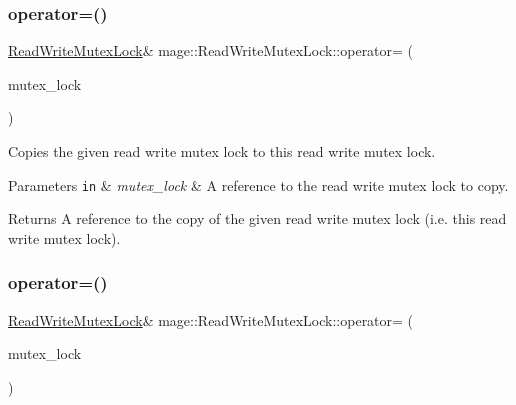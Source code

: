 \subsubsection{\texorpdfstring{operator=()}{operator=()}\hspace{0.1cm}{\footnotesize\ttfamily [1/2]}}
{\footnotesize\ttfamily \hyperlink{structmage_1_1_read_write_mutex_lock}{Read\+Write\+Mutex\+Lock}\& mage\+::\+Read\+Write\+Mutex\+Lock\+::operator= (\begin{DoxyParamCaption}\item[{const \hyperlink{structmage_1_1_read_write_mutex_lock}{Read\+Write\+Mutex\+Lock} \&}]{mutex\+\_\+lock }\end{DoxyParamCaption})\hspace{0.3cm}{\ttfamily [delete]}}

Copies the given read write mutex lock to this read write mutex lock.


\begin{DoxyParams}[1]{Parameters}
\mbox{\tt in}  & {\em mutex\+\_\+lock} & A reference to the read write mutex lock to copy. \\
\hline
\end{DoxyParams}
\begin{DoxyReturn}{Returns}
A reference to the copy of the given read write mutex lock (i.\+e. this read write mutex lock). 
\end{DoxyReturn}
\hypertarget{structmage_1_1_read_write_mutex_lock_a0c31334330a9259b0b68d71b9ee13704}{}\label{structmage_1_1_read_write_mutex_lock_a0c31334330a9259b0b68d71b9ee13704} 
\subsubsection{\texorpdfstring{operator=()}{operator=()}\hspace{0.1cm}{\footnotesize\ttfamily [2/2]}}
{\footnotesize\ttfamily \hyperlink{structmage_1_1_read_write_mutex_lock}{Read\+Write\+Mutex\+Lock}\& mage\+::\+Read\+Write\+Mutex\+Lock\+::operator= (\begin{DoxyParamCaption}\item[{\hyperlink{structmage_1_1_read_write_mutex_lock}{Read\+Write\+Mutex\+Lock} \&\&}]{mutex\+\_\+lock }\end{DoxyParamCaption})\hspace{0.3cm}{\ttfamily [delete]}}

